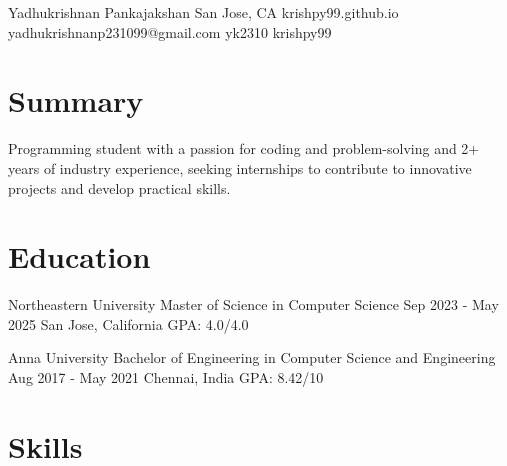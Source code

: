 \documentclass[letterpaper]{resume_config}
\begin{document}
\Header
    {Yadhukrishnan Pankajakshan} %
    {San Jose, CA} %
    {krishpy99.github.io} %
    {yadhukrishnanp231099@gmail.com} %
    {yk2310} %
    {krishpy99}

\section{Summary}
{
    Programming student with a passion for coding and problem-solving and 2+ years of industry experience, seeking internships to contribute to innovative projects and develop practical skills.
}

\section{Education}

\EducationExperience
    {Northeastern University} %
    {Master of Science in Computer Science} %
    {Sep 2023 - May 2025} %
    {San Jose, California} %
    {GPA: 4.0/4.0}

\EducationExperience
    {Anna University} %
    {Bachelor of Engineering in Computer Science and Engineering} %
    {Aug 2017 - May 2021} %
    {Chennai, India} %
    {GPA: 8.42/10}
\vspace{-7pt}

\section{Skills}
\end{document}
